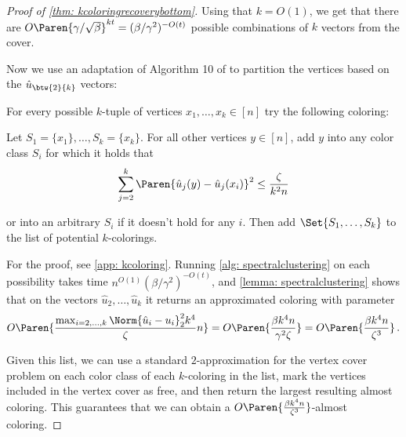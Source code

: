 \begin{proof}[Proof of \cref{thm: kcoloringrecoverybottom}]
    Using that $k=O(1)$, we get that there are $O\Paren{\gamma/\sqrt{\beta}}^{kt}=(\beta/\gamma^2)^{-O(t)}$ possible combinations of $k$ vectors from the cover.

    Now we use an adaptation of Algorithm 10 of \cite{MR3536556-David16} to partition the vertices based on the $\hat{u}_{\btw{2}{k}}$ vectors:


    \begin{algorithm}[H]
        For every possible $k$-tuple of vertices $x_{1}, \ldots, x_k \in [n]$ try the following coloring:
        
        \hspace{8pt} Let $S_1 = \{x_1\}, \ldots, S_k = \{ x_k\}$. For all other vertices $y \in [n]$, add $y$ into any color class $S_{i}$ for which it holds that
        \[
        \sum_{j=2}^k \Paren{\hat{u}_j(y)-\hat{u}_j(x_i)}^2\leq\frac{\zeta}{k^2n}
        \]
        
        \hspace{8pt} or into an arbitrary $S_i$ if it doesn't hold for any $i$. Then add $\Set{S_1, \ldots, S_k}$ to the list of potential $k$-colorings.
        \protect\caption{\label{alg: spectralclustering}Spectral clustering algorithm}
    \end{algorithm}


    For the proof, see \cref{app: kcoloring}.
    Running \cref{alg: spectralclustering} on each possibility takes time $n^{O(1)}(\beta/\gamma^2)^{-O(t)}$, and \cref{lemma: spectralclustering} shows that on the vectors $\hat{u}_{2}, \ldots, \hat{u}_{k}$ it returns an approximated coloring with parameter
    $$O\Paren{\frac{\max_{i=2,\ldots,k} \Norm{\hat{u}_i-u_i}_2^2 k^4}{\zeta} n}=O\Paren{\frac{\beta k^4 n}{\gamma^2\zeta }}=O\Paren{\frac{\beta k^4 n}{\zeta^3}}\,.$$

    Given this list, we can use a standard $2$-approximation for the vertex cover problem on each color class of each $k$-coloring in the list, mark the vertices included in the vertex cover as free, and then return the largest resulting almost coloring. This guarantees that we can obtain a $O\Paren{\frac{\beta k^4 n}{\zeta^3}}$-almost coloring.
\end{proof}

